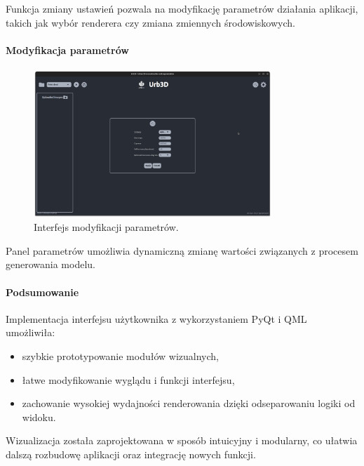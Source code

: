 Funkcja zmiany ustawień pozwala na modyfikację parametrów działania aplikacji, takich jak wybór renderera czy zmiana zmiennych środowiskowych.

\paragraph{Modyfikacja parametrów}
\begin{figure}[h!]
    \centering
    \includegraphics[width=0.8\textwidth]{img/wizualizacja/ui_parametry.png}
    \caption{Interfejs modyfikacji parametrów.}
\end{figure}

Panel parametrów umożliwia dynamiczną zmianę wartości związanych z procesem generowania modelu.

\paragraph{Podsumowanie}

Implementacja interfejsu użytkownika z wykorzystaniem PyQt i QML umożliwiła:
\begin{itemize}
    \item szybkie prototypowanie modułów wizualnych,
    \item łatwe modyfikowanie wyglądu i funkcji interfejsu,
    \item zachowanie wysokiej wydajności renderowania dzięki odseparowaniu logiki od widoku.
\end{itemize}

Wizualizacja została zaprojektowana w sposób intuicyjny i modularny, co ułatwia dalszą rozbudowę aplikacji oraz integrację nowych funkcji.
